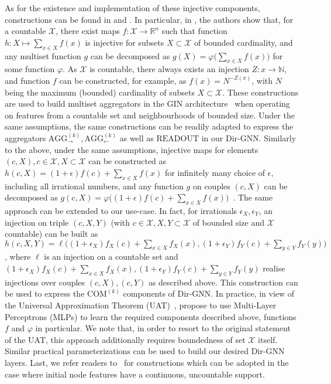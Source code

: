 \documentclass{article}
\newcommand{\inp}{\leftarrow}
\newcommand{\out}{\rightarrow}
\newcommand\oursacro{Dir-GNN}
\theoremstyle{plain}
\theoremstyle{definition}
\theoremstyle{remark}
\begin{document}
As for the existence and implementation of these injective components, constructions can be found in \citet{DBLP:conf/iclr/XuHLJ19} and \citet{corso2020principal}.
In particular, in \citep[Lemma 5]{DBLP:conf/iclr/XuHLJ19}, the authors show that, for a countable $\mathcal{X}$, there exist maps $f: \mathcal{X} \rightarrow \mathbb{R}^n$ such that function $h: X \mapsto \sum_{x \in X} f(x)$ is injective for subsets $X \subset \mathcal{X}$ of bounded cardinality, and any multiset function $g$ can be decomposed as $g(X) = \varphi \big ( \sum_{x \in X} f(x) \big )$ for some function $\varphi$. As $\mathcal{X}$ is countable, there always exists an injection $Z: x \rightarrow \mathbb{N}$, and function $f$ can be constructed, for example, as $f(x) = N^{-Z(x)}$, with $N$ being the maximum (bounded) cardinality of subsets $X \subset \mathcal{X}$. These constructions are used to build multiset aggregators in the GIN architecture~\citep{DBLP:conf/iclr/XuHLJ19} when operating on features from a countable set and neighbourhoods of bounded size. Under the same assumptions, the same constructions can be readily adapted to express the aggregators $\text{AGG}^{(k)}_\out, \text{AGG}^{(k)}_\inp$ as well as $\text{READOUT}$ in our \oursacro{}. 
Similarly to the above, under the same assumptions, injective maps for elements $(c, X), c \in \mathcal{X}, X \subset \mathcal{X}$ can be constructed as $h(c, X) = (1+\epsilon)f(c) + \sum_{x \in X}f(x)$ for infinitely many choice of $\epsilon$, including all irrational numbers, and any function $g$ on couples $(c, X)$ can be decomposed as $g(c, X) = \varphi \big ( (1+\epsilon)f(c) + \sum_{x \in X}f(x) \big )$~\citep[Corollary 6]{DBLP:conf/iclr/XuHLJ19}. The same approach can be extended to our use-case. In fact, for irrationals $\epsilon_X, \epsilon_Y$, an injection on triple $(c, X, Y)$ (with $c \in \mathcal{X}, X, Y \subset \mathcal{X}$ of bounded size and $\mathcal{X}$ countable) can be built as $h(c, X, Y) = \ell \big ( (1+\epsilon_X)f_X(c) + \sum_{x \in X} f_X(x), (1+\epsilon_Y)f_Y(c) + \sum_{y \in Y} f_Y(y) \big )$, where $\ell$ is an injection on a countable set and $(1+\epsilon_X)f_X(c) + \sum_{x \in X} f_X(x), (1+\epsilon_Y)f_Y(c) + \sum_{y \in Y} f_Y(y)$ realise injections over couples $(c, X), (c, Y)$ as described above. This construction can be used to express the $\text{COM}^{(k)}$ components of \oursacro{}. 
In practice, in view of the Universal Approximation Theorem (UAT)~\citep{HORNIK1989359}, \citet{DBLP:conf/iclr/XuHLJ19} propose to use Multi-Layer Perceptrons (MLPs) to learn the required components described above, functions $f$ and $\varphi$ in particular. We note that, in order to resort to the original statement of the UAT, this approach additionally requires boundedness of set $\mathcal{X}$ itself. Similar practical parameterizations can be used to build our desired \oursacro{} layers. Last, we refer readers to~\citep{corso2020principal} for constructions which can be adopted in the case where initial node features have a continuous, uncountable support.
\end{document}
